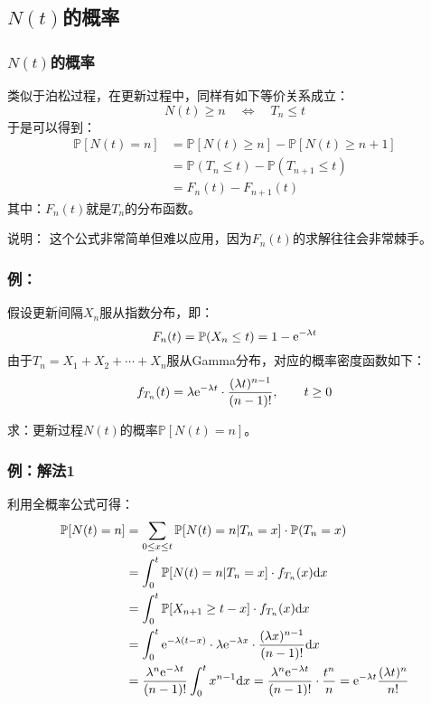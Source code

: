 \documentclass[t]{beamer}
\renewcommand{\Pr}{\mathbb{P}}
\begin{document}
\subsection{$N(t)$的概率}
\begin{frame}
  \frametitle{$N(t)$的概率}
类似于泊松过程，在更新过程中，同样有如下等价关系成立：
  \begin{equation*}
      N(t)\ge n\quad \Longleftrightarrow \quad T_n\le t
  \end{equation*}
  于是可以得到：
  \begin{align*}
       \Pr[N(t)=n]&=\Pr[N(t)\ge n]-\Pr[N(t)\ge n+1] \\
      &=\Pr(T_n\le t)-\Pr(T_{n+1}\le t)\\
      &=F_{n}(t)-F_{n+1}(t)
  \end{align*}
  其中：$F_{n}(t)$就是$T_n$的分布函数。
  
\begin{block}{说明：}
  这个公式非常简单但难以应用，因为$F_{n}(t)$的求解往往会非常棘手。
\end{block}
\end{frame}




\begin{frame}
  \frametitle{例：}
  假设更新间隔$X_n$服从指数分布，即：
  \[F_n(t)=\Pr(X_n\le t)=1-{\rm e}^{-\lambda t}\]
由于$T_n=X_1+X_2+\cdots+X_n$服从Gamma分布，对应的概率密度函数如下：
  \[f_{T_n}(t)=\lambda {\rm e}^{-\lambda t}\cdot \frac{(\lambda t)^{n-1}}{(n-1)!},\qquad t\ge 0\]
  
  求：更新过程$N(t)$的概率$\Pr[N(t)=n]$。

\end{frame}


\begin{frame}
  \frametitle{例：解法1}
利用全概率公式可得：
  \[\begin{split}
      \Pr[N(t)=n]&=\sum_{0\le x\le t} \Pr[N(t)=n|T_n=x]\cdot \Pr(T_n=x)\\
      &= \int^t_0 \Pr[N(t)=n|T_n=x]\cdot  f_{T_n}(x)\dd x\\
      &=\int^t_0 \Pr[X_{n+1}\ge t-x] \cdot  f_{T_n}(x)\dd x\\
      &= \int^t_0 {\rm e}^{-\lambda (t-x)}\cdot \lambda {\rm e}^{-\lambda x}\cdot \frac{(\lambda x)^{n-1}}{(n-1)!}\dd x\\
      &= \frac{\lambda^n {\rm e}^{-\lambda t}}{(n-1)!}\int^t_0 x^{n-1}\dd x=\frac{\lambda^n {\rm e}^{-\lambda t}}{(n-1)!}\cdot \frac{t^n}{n} = {\rm e}^{-\lambda t}\frac{(\lambda t)^n}{n!}
  \end{split}\]
\end{frame}  
\end{document}
